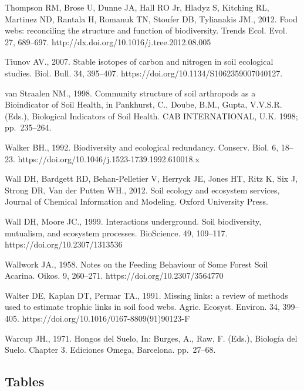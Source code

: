 \documentclass[10pt,oneside]{article}
\begin{document}
Thompson RM, Brose U, Dunne JA, Hall RO Jr, Hladyz S, Kitching RL,
Martinez ND, Rantala H, Romanuk TN, Stoufer DB, Tylianakis JM., 2012.
Food webs: reconciling the structure and function of biodiversity.
Trends Ecol. Evol. 27, 689--697.
http://dx.doi.org/10.1016/j.tree.2012.08.005

Tiunov AV., 2007. Stable isotopes of carbon and nitrogen in soil
ecological studies. Biol. Bull. 34, 395--407.
https://doi.org/10.1134/S1062359007040127.

van Straalen NM., 1998. Community structure of soil arthropods as a
Bioindicator of Soil Health, in Pankhurst, C., Doube, B.M., Gupta,
V.V.S.R. (Eds.), Biological Indicators of Soil Health. CAB
INTERNATIONAL, U.K. 1998; pp.~235--264.

Walker BH., 1992. Biodiversity and ecological redundancy. Conserv. Biol.
6, 18--23. https://doi.org/10.1046/j.1523-1739.1992.610018.x

Wall DH, Bardgett RD, Behan-Pelletier V, Herryck JE, Jones HT, Ritz K,
Six J, Strong DR, Van der Putten WH., 2012. Soil ecology and ecosystem
services, Journal of Chemical Information and Modeling. Oxford
University Press.

Wall DH, Moore JC., 1999. Interactions underground. Soil biodiversity,
mutualism, and ecosystem processes. BioScience. 49, 109--117.
https://doi.org/10.2307/1313536

Wallwork JA., 1958. Notes on the Feeding Behaviour of Some Forest Soil
Acarina. Oikos. 9, 260--271. https://doi.org/10.2307/3564770

Walter DE, Kaplan DT, Permar TA., 1991. Missing links: a review of
methods used to estimate trophic links in soil food webs. Agric.
Ecosyst. Environ. 34, 399--405.
https://doi.org/10.1016/0167-8809(91)90123-F

Warcup JH., 1971. Hongos del Suelo, In: Burges, A., Raw, F. (Eds.),
Biología del Suelo. Chapter 3. Ediciones Omega, Barcelona. pp.~27--68.

\newpage

\hypertarget{tables}{%
\subsection{Tables}\label{tables}}
\end{document}

